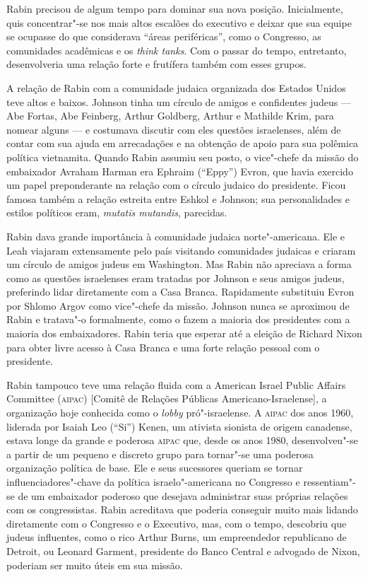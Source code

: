 Rabin precisou de algum tempo para dominar sua nova posição.
Inicialmente, quis concentrar"-se nos mais altos escalões do executivo e
deixar que sua equipe se ocupasse do que considerava ``áreas
periféricas'', como o Congresso, as comunidades acadêmicas e os
\emph{think tanks}. Com o passar do tempo, entretanto, desenvolveria uma
relação forte e frutífera também com esses grupos.

A relação de Rabin com a comunidade judaica organizada dos Estados Unidos teve
altos e baixos. Johnson tinha um círculo de amigos e confidentes judeus
--- Abe Fortas, Abe Feinberg, Arthur Goldberg, Arthur e Mathilde Krim,
para nomear alguns --- e costumava discutir com eles questões israelenses,
além de contar com sua ajuda em arrecadações e na obtenção de apoio
para sua polêmica política vietnamita. Quando Rabin assumiu seu posto, o
vice"-chefe da missão do embaixador Avraham Harman era Ephraim (``Eppy'')
Evron, que havia exercido um papel preponderante na relação com o círculo
judaico do presidente. Ficou famosa também a relação estreita entre
Eshkol e Johnson; sua personalidades e estilos políticos eram,
\emph{mutatis mutandis}, parecidas.

Rabin dava grande importância à comunidade judaica norte"-americana. Ele
e Leah viajaram extensamente pelo país visitando comunidades judaicas e
criaram um círculo de amigos judeus em Washington. Mas Rabin não
apreciava a forma como as questões israelenses eram tratadas por Johnson
e seus amigos judeus, preferindo lidar diretamente com a Casa Branca.
Rapidamente substituiu Evron por Shlomo Argov como vice"-chefe da missão.
Johnson nunca se aproximou de Rabin e tratava"-o formalmente, como o
fazem a maioria dos presidentes com a maioria dos embaixadores. Rabin
teria que esperar até a eleição de Richard Nixon para obter livre acesso
à Casa Branca e uma forte relação pessoal com o presidente.

Rabin tampouco teve uma relação fluida com a American Israel Public
Affairs Committee (\textsc{aipac}) {[}Comitê de Relações Públicas Americano-Israelense{]}, a organização hoje conhecida como o \emph{lobby}
pró"-israelense. A \textsc{aipac} dos anos 1960, liderada por Isaiah Leo (``Si'')
Kenen, um ativista sionista de origem canadense, estava longe da grande
e poderosa \textsc{aipac} que, desde os anos 1980, desenvolveu"-se a partir de um
pequeno e discreto grupo para tornar"-se uma poderosa organização
política de base. Ele e seus sucessores queriam se tornar
influenciadores"-chave da política israelo"-americana no Congresso e
ressentiam"-se de um embaixador poderoso que desejava administrar suas
próprias relações com os congressistas. Rabin acreditava que poderia
conseguir muito mais lidando diretamente com o Congresso e o Executivo,
mas, com o tempo, descobriu que judeus influentes, como o rico Arthur Burns,
um empreendedor republicano de Detroit, ou Leonard Garment, presidente do Banco
Central e advogado de Nixon, poderiam ser muito úteis
em sua missão.

